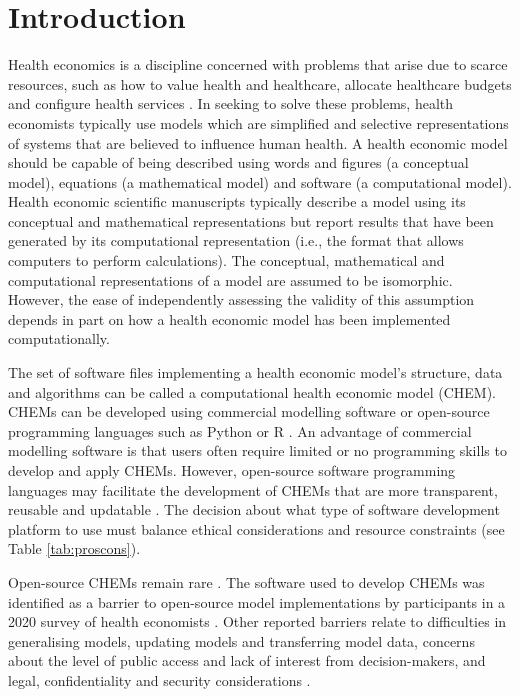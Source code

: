 \documentclass[sn-vancouver,Numbered,pdflatex]{sn-jnl}
\theoremstyle{remark}
\theoremstyle{definition}
\begin{document}
\hypertarget{introduction}{%
\section{Introduction}\label{introduction}}

Health economics is a discipline concerned with problems that arise due to scarce resources, such as how to value health and healthcare, allocate healthcare budgets and configure health services \citep{wagstaff2012four}. In seeking to solve these problems, health economists typically use models which are simplified and selective representations of systems that are believed to influence human health. A health economic model should be capable of being described using words and figures (a conceptual model), equations (a mathematical model) and software (a computational model). Health economic scientific manuscripts typically describe a model using its conceptual and mathematical representations but report results that have been generated by its computational representation (i.e., the format that allows computers to perform calculations). The conceptual, mathematical and computational representations of a model are assumed to be isomorphic. However, the ease of independently assessing the validity of this assumption depends in part on how a health economic model has been implemented computationally.

The set of software files implementing a health economic model's structure, data and algorithms can be called a computational health economic model (CHEM). CHEMs can be developed using commercial modelling software or open-source programming languages such as Python \citep{python2009} or R \citep{RCORE2022}. An advantage of commercial modelling software is that users often require limited or no programming skills to develop and apply CHEMs. However, open-source software programming languages may facilitate the development of CHEMs that are more transparent, reusable and updatable \citep{incerti2019r, Pouwels2022}. The decision about what type of software development platform to use must balance ethical considerations and resource constraints (see Table \ref{tab:proscons}).

Open-source CHEMs remain rare \citep{Feenstra2022, Emerson2019}. The software used to develop CHEMs was identified as a barrier to open-source model implementations by participants in a 2020 survey of health economists \citep{Pouwels2022}. Other reported barriers relate to difficulties in generalising models, updating models and transferring model data, concerns about the level of public access and lack of interest from decision-makers, and legal, confidentiality and security considerations \citep{Pouwels2022}.
\end{document}
